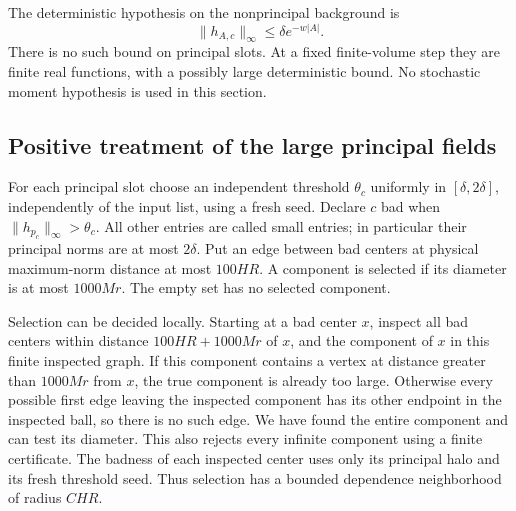 The deterministic hypothesis on the nonprincipal background is
\begin{equation}
 \|h_{A,c}\|_\infty\le\delta e^{-w|A|}.
 \label{block:tail-hypothesis}
\end{equation}
There is no such bound on principal slots.  At a fixed finite-volume
step they are finite real functions, with a possibly large deterministic
bound.  No stochastic moment hypothesis is used in this section.

\subsection{Positive treatment of the large principal fields}

For each principal slot choose an independent threshold
$\theta_c$ uniformly in $[\delta,2\delta]$, independently of the input
list, using a fresh seed.  Declare $c$ bad when
$\|h_{p_c}\|_\infty>\theta_c$.  All other entries are called small
entries; in particular their principal norms are at most $2\delta$.
Put an edge between bad centers at physical maximum-norm distance at
most $100HR$.  A component is selected if its diameter is at most
$1000Mr$.  The empty set has no selected component.

Selection can be decided locally.  Starting at a bad center $x$, inspect
all bad centers within distance $100HR+1000Mr$ of $x$, and the component
of $x$ in this finite inspected graph.  If this component contains a
vertex at distance greater than $1000Mr$ from $x$, the true component
is already too large.  Otherwise every possible first edge leaving the
inspected component has its other endpoint in the inspected ball, so
there is no such edge.  We have found the entire component and can test
its diameter.  This also rejects every infinite component using a
finite certificate.  The badness of each inspected center uses only
its principal halo and its fresh threshold seed.  Thus selection has a
bounded dependence neighborhood of radius $C HR$.

